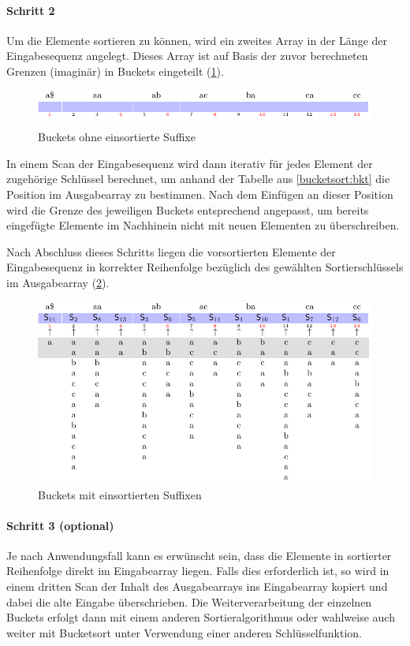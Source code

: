 \paragraph{Schritt 2}
Um die Elemente sortieren zu können, wird ein zweites Array in der Länge der Eingabesequenz angelegt. Dieses Array ist auf Basis der zuvor berechneten Grenzen (imaginär) in Buckets eingeteilt (\cref{bucketsort:empty_buckets}).
\begin{figure}[ht]
    \includegraphics[width=\textwidth]{kapitel/4_komponenten/sortieralgorithmen/bucketsort/step_02/empty_buckets/image.pdf}
    \caption{Buckets ohne einsortierte Suffixe}
    \label{bucketsort:empty_buckets}
\end{figure}
In einem Scan der Eingabesequenz wird dann iterativ für jedes Element der zugehörige Schlüssel berechnet, um anhand der Tabelle aus \cref{bucketsort:bkt} die Position im Ausgabearray zu bestimmen. Nach dem Einfügen an dieser Position wird die Grenze des jeweiligen Buckets entsprechend angepasst, um bereits eingefügte Elemente im Nachhinein nicht mit neuen Elementen zu überschreiben.\par
Nach Abschluss dieses Schritts liegen die vorsortierten Elemente der Eingabesequenz in korrekter Reihenfolge bezüglich des gewählten Sortierschlüssels im Ausgabearray (\cref{bucketsort:buckets}).
\begin{figure}[ht]
    \includegraphics[width=\textwidth]{kapitel/4_komponenten/sortieralgorithmen/bucketsort/step_02/buckets/image.pdf}
    \caption{Buckets mit einsortierten Suffixen}
    \label{bucketsort:buckets}
\end{figure}
\paragraph{Schritt 3 (optional)}
Je nach Anwendungsfall kann es erwünscht sein, dass die Elemente in sortierter Reihenfolge direkt im Eingabearray liegen. Falls dies erforderlich ist, so wird in einem dritten Scan der Inhalt des Ausgabearrays ins Eingabearray kopiert und dabei die alte Eingabe überschrieben. Die Weiterverarbeitung der einzelnen Buckets erfolgt dann mit einem anderen Sortieralgorithmus oder wahlweise auch weiter mit Bucketsort unter Verwendung einer anderen Schlüsselfunktion.
